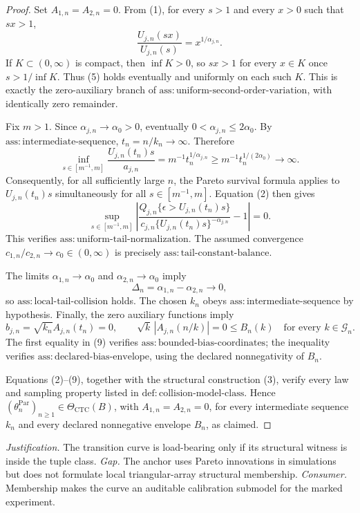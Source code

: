 \documentclass{article}
\begin{document}
\begin{proof}
Set \(A_{1,n}=A_{2,n}=0\).  From (1), for every \(s>1\) and every \(x>0\) such that \(sx>1\),
\[
 \frac{U_{j,n}(sx)}{U_{j,n}(s)}=x^{1/\alpha_{j,n}}. \tag{5}
\]
If \(K\subset(0,\infty)\) is compact, then \(\inf K>0\), so \(sx>1\) for every \(x\in K\) once \(s>1/\inf K\).  Thus (5) holds eventually and uniformly on each such \(K\).  This is exactly the zero-auxiliary branch of \(\mathrm{ass:uniform\text{-}second\text{-}order\text{-}variation}\), with identically zero remainder.

Fix \(m>1\).  Since \(\alpha_{j,n}\to\alpha_0>0\), eventually \(0<\alpha_{j,n}\leq2\alpha_0\).  By \(\mathrm{ass:intermediate\text{-}sequence}\), \(t_n=n/k_n\to\infty\).  Therefore
\[
 \inf_{s\in[m^{-1},m]}
 \frac{U_{j,n}(t_n)s}{a_{j,n}}
 =m^{-1}t_n^{1/\alpha_{j,n}}
 \geq m^{-1}t_n^{1/(2\alpha_0)}\longrightarrow\infty. \tag{6}
\]
Consequently, for all sufficiently large \(n\), the Pareto survival formula applies to \(U_{j,n}(t_n)s\) simultaneously for all \(s\in[m^{-1},m]\).  Equation (2) then gives
\[
 \sup_{s\in[m^{-1},m]}
 \left|
 \frac{Q_{j,n}\{\epsilon>U_{j,n}(t_n)s\}}
 {c_{j,n}\{U_{j,n}(t_n)s\}^{-\alpha_{j,n}}}-1
 \right|=0. \tag{7}
\]
This verifies \(\mathrm{ass:uniform\text{-}tail\text{-}normalization}\).  The assumed convergence \(c_{1,n}/c_{2,n}\to c_0\in(0,\infty)\) is precisely \(\mathrm{ass:tail\text{-}constant\text{-}balance}\).

The limits \(\alpha_{1,n}\to\alpha_0\) and \(\alpha_{2,n}\to\alpha_0\) imply
\[
 \Delta_n=\alpha_{1,n}-\alpha_{2,n}\longrightarrow0, \tag{8}
\]
so \(\mathrm{ass:local\text{-}tail\text{-}collision}\) holds.  The chosen \(k_n\) obeys \(\mathrm{ass:intermediate\text{-}sequence}\) by hypothesis.  Finally, the zero auxiliary functions imply
\[
 b_{j,n}=\sqrt{k_n}A_{j,n}(t_n)=0,
 \qquad
 \sqrt{k}\,|A_{j,n}(n/k)|=0\leq B_n(k)
 \quad\text{for every }k\in\mathcal G_n. \tag{9}
\]
The first equality in (9) verifies \(\mathrm{ass:bounded\text{-}bias\text{-}coordinates}\); the inequality verifies \(\mathrm{ass:declared\text{-}bias\text{-}envelope}\), using the declared nonnegativity of \(B_n\).

Equations (2)--(9), together with the structural construction (3), verify every law and sampling property listed in \(\mathrm{def:collision\text{-}model\text{-}class}\).  Hence \((\theta_n^{\mathrm{Par}})_{n\geq1}\in\Theta_{\mathrm{CTC}}(B)\), with \(A_{1,n}=A_{2,n}=0\), for every intermediate sequence \(k_n\) and every declared nonnegative envelope \(B_n\), as claimed.
\end{proof}
\par\smallskip\noindent \textit{Justification.} The transition curve is load-bearing only if its structural witness is inside the tuple class. \textit{Gap.} The anchor uses Pareto innovations in simulations but does not formulate local triangular-array structural membership. \textit{Consumer.} Membership makes the curve an auditable calibration submodel for the marked experiment.
\end{document}
